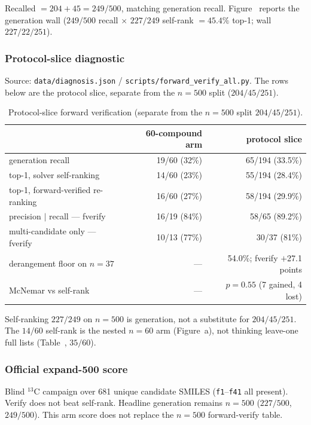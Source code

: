 Recalled $=204+45=249/500$, matching generation recall.
Figure~ reports the generation wall
($249/500$ recall $\times$ $227/249$ self-rank $=45.4\%$ top-1; wall $227/22/251$).

\subsubsection{Protocol-slice diagnostic}

Source: \texttt{data/diagnosis.json} / \texttt{scripts/forward\_verify\_all.py}.
The rows below are the protocol slice, separate from the $n{=}500$ split ($204/45/251$).

\begin{table}[ht]
\caption{Protocol-slice forward verification
(separate from the $n{=}500$ split $204/45/251$).}
\centering
\begin{tabular}{@{}lrr@{}}
\toprule
 & 60-compound arm & protocol slice \\
\midrule
generation recall & 19/60 (32\%) & 65/194 (33.5\%) \\
top-1, solver self-ranking & 14/60 (23\%) & 55/194 (28.4\%) \\
top-1, forward-verified re-ranking & 16/60 (27\%) & 58/194 (29.9\%) \\
precision $|$ recall --- fverify & 16/19 (84\%) & 58/65 (89.2\%) \\
multi-candidate only --- fverify & 10/13 (77\%) & 30/37 (81\%) \\
derangement floor on $n{=}37$ & --- & 54.0\%; fverify $+$27.1 points \\
McNemar vs self-rank & --- & $p{=}0.55$ (7 gained, 4 lost) \\
\bottomrule
\end{tabular}
\end{table}

Self-ranking $227/249$ on $n{=}500$ is generation, not a substitute
for $204/45/251$.
The $14/60$ self-rank is the nested $n{=}60$ arm
(Figure~a), not thinking leave-one full lists
(Table~, $35/60$).

\subsubsection{Official expand-500 score}

Blind $^{13}$C campaign over 681 unique candidate SMILES
(\texttt{f1}--\texttt{f41} all present).
Verify does not beat self-rank.
Headline generation remains $n{=}500$ ($227/500$, $249/500$).
This arm score does not replace the $n{=}500$ forward-verify table.

